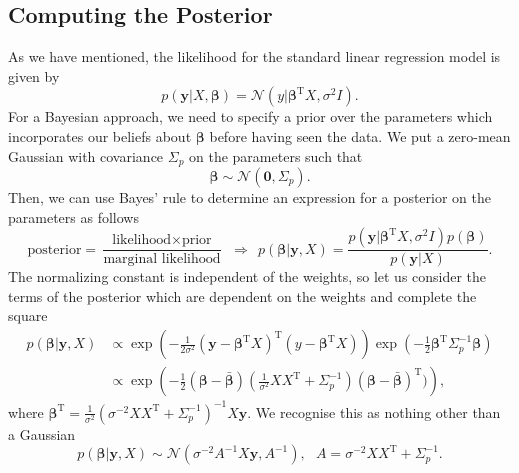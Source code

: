 \documentclass[10pt,a4paper]{article}
\newcommand{\Beta}{\boldsymbol\beta}
\newcommand{\BetaT}{\Beta^{\text{T}}}
\numberwithin{equation}{section}
\theoremstyle{plain}
\theoremstyle{definition}
\theoremstyle{own}
\begin{document}
\subsection{Computing the Posterior}
As we have mentioned, the likelihood for the standard linear regression model is given by
\begin{equation}
p(\mathbf{y}| X, \boldsymbol\beta) = \mathcal{N}(y|\boldsymbol\beta^{\text{T}}X, \sigma^2 I).
\end{equation}
For a Bayesian approach, we need to specify a prior over the parameters which incorporates our beliefs about $\boldsymbol\beta$ before having seen the data. We put a zero-mean Gaussian with covariance $\Sigma_p$ on the parameters such that
\begin{equation}
\boldsymbol\beta \sim \mathcal{N}(\mathbf{0}, \Sigma_p).
\end{equation}
Then, we can use Bayes' rule to determine an expression for a posterior on the parameters as follows
\begin{equation}
\text{posterior} = \frac{\text{likelihood} \times \text{prior}}{\text{marginal likelihood}} ~~ \Rightarrow ~~ p(\boldsymbol\beta| \mathbf{y}, X) = \frac{p(\mathbf{y}|\boldsymbol\beta^{\text{T}}X, \sigma^2 I)p(\boldsymbol\beta)}{p(\mathbf{y}|X)}.
\end{equation}
The normalizing constant is independent of the weights, so let us consider the terms of the posterior which are dependent on the weights and complete the square
\begin{align}
p(\Beta| \mathbf{y}, X) & \propto \exp\left( -\frac{1}{2\sigma^2}(\mathbf{y} - \BetaT X)^{\text{T}}(y - \BetaT X) \right) \exp \left( - \frac{1}{2}\BetaT \Sigma^{-1}_p \Beta \right) \\
& \propto \exp \left( -\frac{1}{2}(\Beta - \bar{\Beta}) (\frac{1}{\sigma^2} XX^{\text{T}} + \Sigma_p^{-1}) (\Beta - \bar{\Beta})^{\text{T}}) \right),
\end{align}
where $\BetaT = \frac{1}{\sigma^2} \left( \sigma^{-2} XX^{\text{T}} + \Sigma_p^{-1} \right)^{-1} X \mathbf{y}$. We recognise this as nothing other than a Gaussian
\begin{equation} \label{eq58}
\boxed{p(\Beta|\mathbf{y}, X) \sim \mathcal{N}(\sigma^{-2}A^{-1}X\mathbf{y}, A^{-1}), ~~~ A = \sigma^{-2} XX^{\text{T}} + \Sigma_p^{-1}.}
\end{equation}
\end{document}
